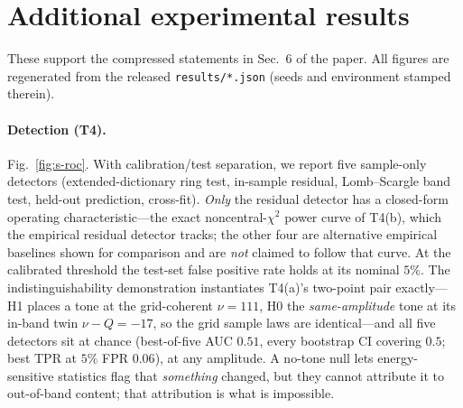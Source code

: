 \documentclass[10pt]{article}
\begin{document}
\section{Additional experimental results}\label{sup:addl}
These support the compressed statements in Sec.~6 of the paper.  All figures are
regenerated from the released \texttt{results/*.json} (seeds and environment stamped
therein).

\paragraph{Detection (T4).}  Fig.~\ref{fig:s-roc}.  With calibration/test separation, we
report five sample-only detectors (extended-dictionary ring test, in-sample residual,
Lomb--Scargle band test, held-out prediction, cross-fit).  \emph{Only} the residual
detector has a closed-form operating characteristic---the exact noncentral-$\chi^2$ power
curve of T4(b), which the empirical residual detector tracks; the other four are
alternative empirical baselines shown for comparison and are \emph{not} claimed to follow
that curve.  At the calibrated threshold the test-set false positive rate holds at its
nominal $5\%$.  The indistinguishability demonstration
instantiates T4(a)'s two-point pair exactly---H1 places a tone at the grid-coherent
$\nu{=}111$, H0 the \emph{same-amplitude} tone at its in-band twin $\nu-Q=-17$, so the
grid sample laws are identical---and all five detectors sit at chance (best-of-five
AUC $0.51$, every bootstrap CI covering $0.5$; best TPR at $5\%$ FPR $0.06$), at any
amplitude.  A no-tone null lets energy-sensitive statistics flag that \emph{something}
changed, but they cannot attribute it to out-of-band content; that attribution is what is
impossible.
\end{document}
